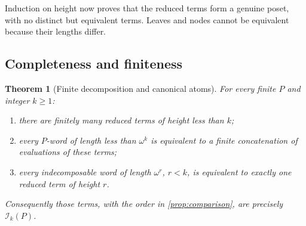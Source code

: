 \documentclass[11pt,letterpaper]{article}
\newtheorem{theorem}{Theorem}[section]
\theoremstyle{definition}
\theoremstyle{remark}
\newcommand{\I}{\mathcal I}
\begin{document}
Induction on height now proves that the reduced terms form a genuine
poset, with no distinct but equivalent terms. Leaves and nodes cannot be
equivalent because their lengths differ.

\subsection{Completeness and finiteness}

\begin{theorem}[Finite decomposition and canonical atoms]\label{thm:normalform}
For every finite $P$ and integer $k\ge1$:
\begin{enumerate}
\item there are finitely many reduced terms of height less than $k$;
\item every $P$-word of length less than $\omega^k$ is equivalent to a
finite concatenation of evaluations of these terms;
\item every indecomposable word of length $\omega^r$, $r<k$, is equivalent
to exactly one reduced term of height $r$.
\end{enumerate}
Consequently those terms, with the order in \cref{prop:comparison}, are
precisely $\I_k(P)$.
\end{theorem}
\end{document}
